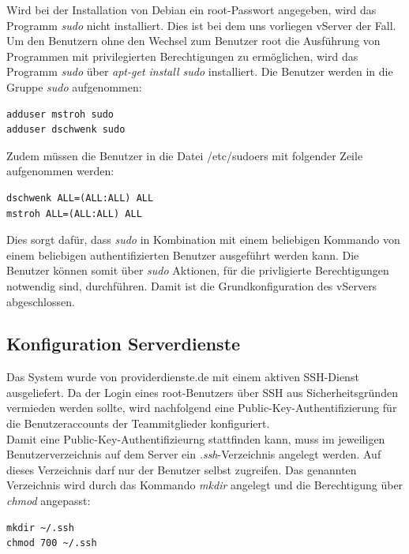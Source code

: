 Wird bei der Installation von Debian ein root-Passwort angegeben, wird das Programm \textit{sudo} nicht installiert. Dies ist bei dem uns vorliegen vServer der Fall. Um den Benutzern ohne den Wechsel zum Benutzer root die Ausführung von Programmen mit privilegierten Berechtigungen zu ermöglichen, wird das Programm \textit{sudo} über \textit{apt-get install sudo} installiert. Die Benutzer werden in die Gruppe \textit{sudo} aufgenommen:

\begin{lstlisting}[style=customc]
adduser mstroh sudo
adduser dschwenk sudo
\end{lstlisting}

Zudem müssen die Benutzer in die Datei /etc/sudoers mit folgender Zeile aufgenommen werden:

\begin{lstlisting}[style=customc]
dschwenk ALL=(ALL:ALL) ALL
mstroh ALL=(ALL:ALL) ALL
\end{lstlisting}

Dies sorgt dafür, dass \textit{sudo} in Kombination mit einem beliebigen Kommando von einem beliebigen authentifizierten Benutzer ausgeführt werden kann. Die Benutzer können somit über \textit{sudo} Aktionen, für die privligierte Berechtigungen notwendig sind, durchführen. Damit ist die Grundkonfiguration des vServers abgeschlossen. %


\subsection{Konfiguration Serverdienste}
\label{subsec:Konfiguration Serverdienste}

Das System wurde von providerdienste.de mit einem aktiven SSH-Dienst ausgeliefert. Da der Login eines root-Benutzers über SSH aus Sicherheitsgründen vermieden werden sollte, wird nachfolgend eine Public-Key-Authentifizierung für die Benutzeraccounts der Teammitglieder konfiguriert.\\

Damit eine Public-Key-Authentifizieurng stattfinden kann, muss im jeweiligen Benutzerverzeichnis auf dem Server ein \textit{.ssh}-Verzeichnis angelegt werden. Auf dieses Verzeichnis darf nur der Benutzer selbst zugreifen. Das genannten Verzeichnis wird durch das Kommando \textit{mkdir} angelegt und die Berechtigung über \textit{chmod} angepasst:

\begin{lstlisting}[style=customc]
mkdir ~/.ssh
chmod 700 ~/.ssh
\end{lstlisting}

